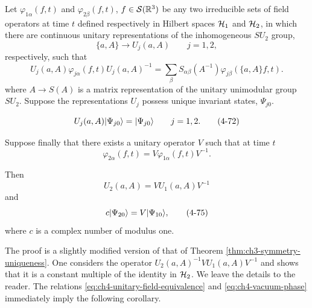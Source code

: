 \begin{theorem}[4-14]\label{thm:ch4-14-unitary-equivalence}
Let $\varphi_{1\alpha}(f,t)$ and $\varphi_{2\beta}(f,t)$,
$f\in\mathcal{S}(\mathbb R^3)$ be any two irreducible sets of field operators at
time $t$ defined respectively in Hilbert spaces $\mathcal{H}_1$ and
$\mathcal{H}_2$, in which there are continuous unitary representations of the
inhomogeneous $SU_2$ group,
\begin{equation*}
  \{a,A\}\longrightarrow U_j(a,A)\qquad j=1,2,
\end{equation*}
respectively, such that
\begin{equation}
  U_j(a,A)\varphi_{j\alpha}(f,t)U_j(a,A)^{-1}
  =\sum_\beta S_{\alpha\beta}(A^{-1})
  \varphi_{j\beta}(\{a,A\}f,t).
  \tag{4-71}\label{eq:ch4-field-transformation}
\end{equation}
where $A\longrightarrow S(A)$ is a matrix representation of the unitary
unimodular group $SU_2$.  Suppose the representations $U_j$ possess unique
invariant states, $\Psi_{j0}$.

\begin{equation}
  U_j(a,A)\lvert \Psi_{j0}\rangle=\lvert \Psi_{j0}\rangle\qquad j=1,2.
  \tag{4-72}\label{eq:ch4-invariant-vacuum}
\end{equation}

Suppose finally that there exists a unitary operator $V$ such that at time
$t$
\begin{equation}
  \varphi_{2\alpha}(f,t)
  =V\varphi_{1\alpha}(f,t)V^{-1}.
  \tag{4-73}\label{eq:ch4-unitary-field-equivalence}
\end{equation}

Then
\begin{equation}
  U_2(a,A)=VU_1(a,A)V^{-1}
  \tag{4-74}\label{eq:ch4-representation-equivalence}
\end{equation}
and
\begin{equation}
  c\lvert \Psi_{20}\rangle=V\lvert \Psi_{10}\rangle,
  \tag{4-75}\label{eq:ch4-vacuum-phase}
\end{equation}
where $c$ is a complex number of modulus one.
\end{theorem}

The proof is a slightly modified version of that of Theorem \ref{thm:ch3-symmetry-uniqueness}.  One
considers the operator $U_2(a,A)^{-1}VU_1(a,A)V^{-1}$ and shows that it is a
constant multiple of the identity in $\mathcal{H}_2$.  We leave the details to
the reader.  The relations \eqref{eq:ch4-unitary-field-equivalence} and \eqref{eq:ch4-vacuum-phase} immediately imply the following
corollary.

